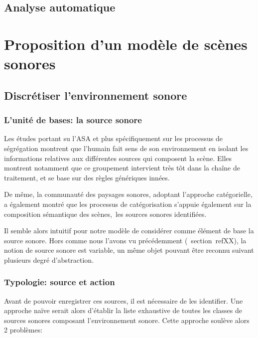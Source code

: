 \subsection{Analyse automatique}

\section{Proposition d'un modèle de scènes sonores}
\label{sec:ch4_model}

\subsection{Discrétiser l'environnement sonore}
\label{sec:ch4_modelInspi}

\subsubsection{L'unité de bases: la source sonore}

Les études portant su l'ASA et plus spécifiquement sur les processus de ségrégation montrent que l'humain fait sens de son environnement en isolant les informations relatives aux différentes sources qui composent la scène. Elles montrent notamment que ce groupement intervient très tôt dans la chaîne de traitement, et se base sur des règles génériques innées. \\


De même, la communauté des paysages sonores, adoptant l’approche catégorielle, a également montré que les processus de catégorisation s'appuie également sur la composition sémantique des scènes,\ie~les sources sonores identifiées.

Il semble alors intuitif pour notre modèle de considérer comme élément de base la source sonore. Hors comme nous l'avons vu précédemment (\cf~section~ref{XX}), la notion de source sonore est variable, un même objet pouvant être reconnu suivant plusieurs degré d'abstraction.

\subsubsection{Typologie: source et action}

Avant de pouvoir enregistrer ces sources, il est nécessaire de les identifier. Une approche naïve serait alors d'établir la liste exhaustive de toutes les classes de sources sonores composant l'environnement sonore. Cette approche soulève alors 2 problèmes:

